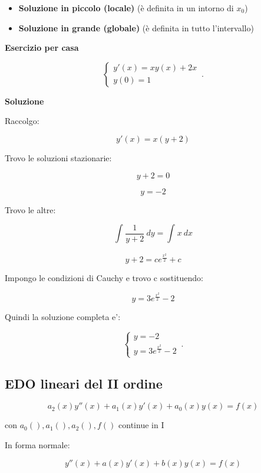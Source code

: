 \documentclass[11pt]{article}
\begin{document}
\begin{itemize}
    \item \textbf{ Soluzione in piccolo (locale) } (è definita in un intorno di $x_0$)
    \item \textbf{ Soluzione in grande (globale) } (è definita in tutto l'intervallo)
\end{itemize}

\textbf{Esercizio per casa}

\begin{equation}
    \begin{cases}
      y'(x) = xy(x)+2x\\
      y(0) = 1
    \end{cases}\,.
\end{equation}

\textbf{Soluzione} 

Raccolgo: 

\[
    y'(x)=x(y+2)
\]

Trovo le soluzioni stazionarie:

\[
    y+2=0
\]

\[
    y=-2
\]

Trovo le altre:

\[
    \int_{}^{} {\frac{1}{y+2}} \: dy = \int_{}^{} {x} \: dx 
\]

\[
    y+2 = c e ^{ \frac{x^{2}}{2}}+c
\]

Impongo le condizioni di Cauchy e trovo c sostituendo:

\[
    y=3e ^{ \frac{x^{2}}{2}}-2
\]

Quindi la soluzione completa e':

    \begin{equation}
        \begin{cases}
            y=-2\\
            y=3e ^{ \frac{x^{2}}{2}}-2
        \end{cases}\,.
    \end{equation}



\subsection{EDO lineari del II ordine}

\[
    a_2(x)y''(x) + a_1(x) y'(x) + a_0(x) y(x) = f(x)
\]

con $a_0(),a_1(),a_2(),f()$ continue in I

In forma normale:

\[
    y''(x) + a(x) y'(x) + b(x)y(x) = f(x)
\]
\end{document}

